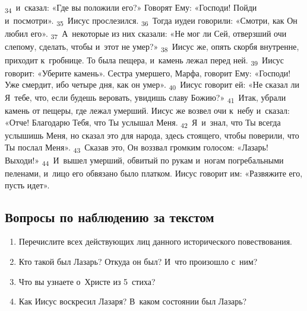 \documentclass[a4paper,12pt]{article}
\begin{document}
\textsubscript{34}~и~сказал: «Где вы положили его?» Говорят Ему: «Господи! Пойди и~посмотри».
\textsubscript{35}~Иисус прослезился.
\textsubscript{36}~Тогда иудеи говорили: «Смотри, как Он любил его».
\textsubscript{37}~А~некоторые из них сказали: «Не мог ли Сей, отверзший очи слепому, сделать, чтобы и~этот не умер?»
\textsubscript{38}~Иисус же, опять скорбя внутренне, приходит к~гробнице. То была пещера, и~камень лежал перед ней.
\textsubscript{39}~Иисус говорит: «Уберите камень». Сестра умершего, Марфа, говорит Ему: «Господи! Уже смердит, ибо четыре дня, как он умер».
\textsubscript{40}~Иисус говорит ей: «Не сказал ли Я~тебе, что, если будешь веровать, увидишь славу Божию?»
\textsubscript{41}~Итак, убрали камень от пещеры, где лежал умерший. Иисус же возвел очи к~небу и~сказал: «Отче! Благодарю Тебя, что Ты услышал Меня.
\textsubscript{42}~Я~и~знал, что Ты всегда услышишь Меня, но сказал это для народа, здесь стоящего, чтобы поверили, что Ты послал Меня».
\textsubscript{43}~Сказав это, Он воззвал громким голосом: «Лазарь! Выходи!»
\textsubscript{44}~И~вышел умерший, обвитый по рукам и~ногам погребальными пеленами, и~лицо его обвязано было платком. Иисус говорит им: «Развяжите его, пусть идет». 

\subsection*{Вопросы по наблюдению за текстом}
\begin{enumerate}
    \item Перечислите всех действующих лиц данного исторического повествования. 
    
    \myline
    
    \myline
    \item Кто такой был Лазарь? Откуда он был? И~что произошло с~ним? 
    
    \myline
    
    \myline
    \item Что вы узнаете о~Христе из 5~стиха? 
    
    \myline
    
    \myline
    \item Как Иисус воскресил Лазаря? В~каком состоянии был Лазарь? 
    
    \myline
    
    \myline
\end{enumerate}
\end{document}
